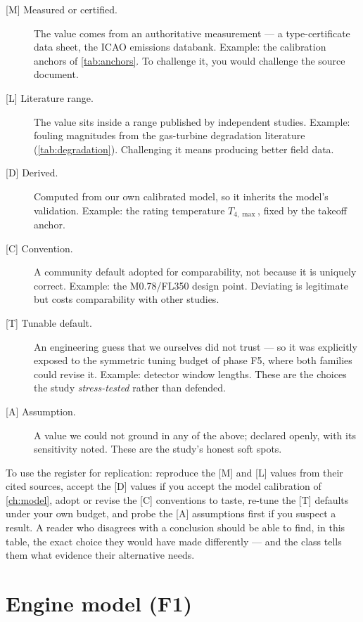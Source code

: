 \begin{description}
  \item[{[M]} Measured or certified.] The value comes from an authoritative measurement ---
    a type-certificate data sheet, the ICAO emissions databank. Example: the calibration
    anchors of \cref{tab:anchors}. To challenge it, you would challenge the source document.
  \item[{[L]} Literature range.] The value sits inside a range published by independent
    studies. Example: fouling magnitudes from the gas-turbine degradation literature
    (\cref{tab:degradation}). Challenging it means producing better field data.
  \item[{[D]} Derived.] Computed from our own calibrated model, so it inherits the model's
    validation. Example: the rating temperature $T_{4,\max}$, fixed by the takeoff anchor.
  \item[{[C]} Convention.] A community default adopted for comparability, not because it is
    uniquely correct. Example: the M0.78/FL350 design point. Deviating is legitimate but
    costs comparability with other studies.
  \item[{[T]} Tunable default.] An engineering guess that we ourselves did not trust ---
    so it was explicitly exposed to the symmetric tuning budget of phase F5, where both
    families could revise it. Example: detector window lengths. These are the choices the
    study \emph{stress-tested} rather than defended.
  \item[{[A]} Assumption.] A value we could not ground in any of the above; declared openly,
    with its sensitivity noted. These are the study's honest soft spots.
\end{description}

To use the register for replication: reproduce the [M] and [L] values from their cited
sources, accept the [D] values if you accept the model calibration of \cref{ch:model},
adopt or revise the [C] conventions to taste, re-tune the [T] defaults under your own budget,
and probe the [A] assumptions first if you suspect a result. A reader who disagrees with a
conclusion should be able to find, in this table, the exact choice they would have made
differently --- and the class tells them what evidence their alternative needs.

\section*{Engine model (F1)}

